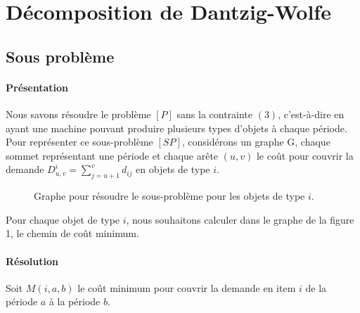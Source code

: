 \documentclass[12pt,a4paper]{article}
\begin{document}
 	\newpage
 	
	\section*{Décomposition de Dantzig-Wolfe}
	\subsection*{Sous problème}
	\paragraph{Présentation} Nous savons résoudre le problème $[P]$ sans la contrainte $(3)$, c'est-à-dire en ayant une machine pouvant produire plusieurs types d'objets à chaque période. Pour représenter ce sous-problème $[SP]$, considérons un graphe G, chaque sommet représentant une période et chaque arête $(u,v)$ le coût pour couvrir la demande $D^i_{u,v} = \sum_{j=u+1}^{v} d_{ij}$ en objets de type $i$. \medbreak
	
	\begin{figure}[h!]
		\centering
	\caption{Graphe pour résoudre le sous-problème pour les objets de type $i$.}
	\end{figure}
	
	 Pour chaque objet de type $i$, nous souhaitons calculer dans le graphe de la figure 1, le chemin de coût minimum.
	 
	 \paragraph{Résolution} Soit $M(i,a,b)$ le coût minimum pour couvrir la demande en item $i$ de la période $a$ à la période $b$.
	 
\end{document}
